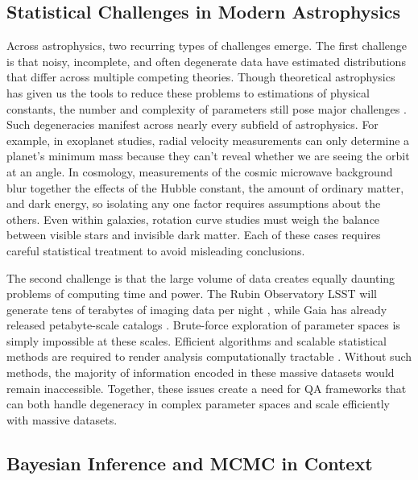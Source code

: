 \documentclass[preprint,longauthor]{aastex631}
\numberwithin{equation}{section}
\begin{document}
\subsection{Statistical Challenges in Modern Astrophysics}

Across astrophysics, two recurring types of challenges emerge. The first challenge is that noisy, incomplete, and often degenerate data have estimated distributions that differ across multiple competing theories. Though theoretical astrophysics has given us the tools to reduce these problems to estimations of physical constants, the number and complexity of parameters still pose major challenges \citep{schaferFrameworkStatisticalInference2015}. Such degeneracies manifest across nearly every subfield of astrophysics. For example, in exoplanet studies, radial velocity measurements can only determine a planet’s minimum mass because they can’t reveal whether we are seeing the orbit at an angle. In cosmology, measurements of the cosmic microwave background blur together the effects of the Hubble constant, the amount of ordinary matter, and dark energy, so isolating any one factor requires assumptions about the others. Even within galaxies, rotation curve studies must weigh the balance between visible stars and invisible dark matter. Each of these cases requires careful statistical treatment to avoid misleading conclusions.

The second challenge is that the large volume of data creates equally daunting problems of computing time and power. The Rubin Observatory LSST will generate tens of terabytes of imaging data per night \citep{borneAstroinformatics21stCentury2009}, while Gaia has already released petabyte-scale catalogs \citep{gaiacollaborationGaiaDataRelease2023}. Brute-force exploration of parameter spaces is simply impossible at these scales. Efficient algorithms and scalable statistical methods are required to render analysis computationally tractable \citep{huijseComputationalIntelligenceChallenges2014}. Without such methods, the majority of information encoded in these massive datasets would remain inaccessible. Together, these issues create a need for QA frameworks that can both handle degeneracy in complex parameter spaces and scale efficiently with massive datasets.

\subsection{Bayesian Inference and MCMC in Context}
\end{document}
